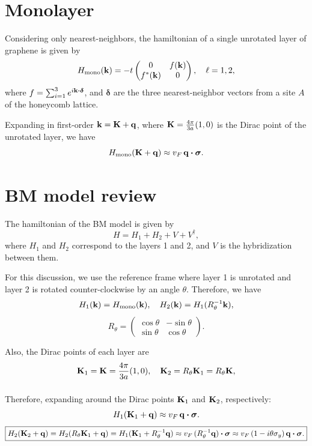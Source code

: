 \section{Monolayer}

Considering only nearest-neighbors, the hamiltonian of a single unrotated layer of graphene is given by
$$
H_{\text{mono}}({\vb{k}}) = -t
\begin{pmatrix}
0 & f({\vb{k}}) \\
f^*({\vb{k}}) & 0
\end{pmatrix}
, \quad \ell = 1, 2,
$$
where $f = \sum_{i=1}^{3} e^{i \k \vdot \bm{\delta}}$, and $\bm{\delta}$ are the three nearest-neighbor vectors from a site $A$ of the honeycomb lattice.

Expanding in first-order ${\vb{k}} = {\vb{K}} + {\vb{q}}$, where ${\vb{K}} = \frac{4\pi}{3a} (1, 0)$ is the Dirac point of the unrotated layer, we have
$$
H_{\text{mono}}(\K + \q) \approx v_F \, \q \vdot \bm{\sigma}.
$$

\section{BM model review}

The hamiltonian of the BM model is given by
$$
H = H_1 + H_2 + V + V^\dagger,
$$
where $H_1$ and $H_2$ correspond to the layers 1 and 2, and $V$ is the hybridization between them.

\n

For this discussion, we use the reference frame where layer 1 is unrotated and layer 2 is rotated counter-clockwise by an angle $\theta$. Therefore, we have
$$
H_1({\vb{k}}) = H_{\text{mono}}({\vb{k}}), \quad H_2({\vb{k}}) = H_1(R_\theta^{-1}{\vb{k}}),
$$
$$
R_\theta =
\begin{pmatrix}
\cos\theta & -\sin\theta \\
\sin\theta & \cos\theta
\end{pmatrix}.
$$

Also, the Dirac points of each layer are
$$
{\vb{K}}_1 = {\vb{K}} = \frac{4\pi}{3a} (1, 0), \quad {\vb{K}}_2 = R_\theta {\vb{K}}_1 = R_\theta {\vb{K}},
$$
$$
$$

Therefore, expanding around the Dirac points ${\vb{K}}_1$ and ${\vb{K}}_2$, respectively:
$$
H_1(\K_1 + \q) \approx v_F \, \q \vdot \bm{\sigma}.
$$
$$
\boxed{ H_2(\K_2 + \q) = H_2(R_\theta \K_1 + \q) = H_1(\K_1 + R_\theta^{-1}\q) \approx v_F \, (R_\theta^{-1}\q) \vdot \bm{\sigma} \approx v_F \, (1 - i \theta \sigma_y ) \, \q \vdot \bm{\sigma}. }
$$

